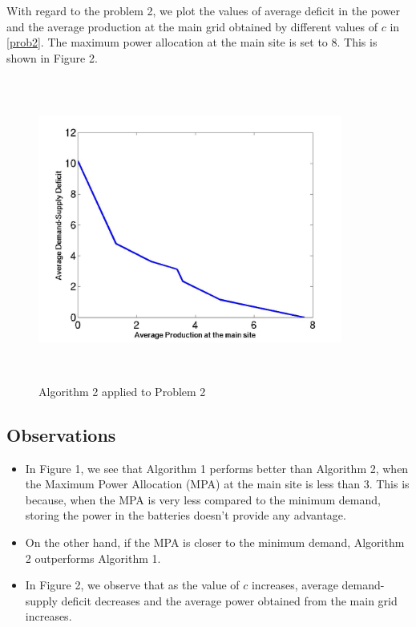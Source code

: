 \documentclass[conference]{IEEEtran}
\begin{document}
With regard to the problem 2, we plot the values of average deficit in the power and the average production at the main grid obtained by different values of $c$ in \eqref{prob2}. The maximum power allocation at the main site is set to 8. This is shown in Figure 2. 

\begin{figure}[h!]
\begin{center}
 \includegraphics[width = 10cm,height=10cm]{plot2.jpg}
 \caption{Algorithm 2 applied to Problem 2}
 \end{center}
 \end{figure}

\subsection{Observations}

\begin{itemize}
\item In Figure 1, we see that Algorithm 1 performs better than Algorithm 2, when the Maximum Power Allocation (MPA) at the main site is less than 3. This is because, when the MPA is very less compared to the minimum demand, storing the power in the batteries doesn't provide any advantage. 
\item On the other hand, if the MPA is closer to the minimum demand, Algorithm 2 outperforms Algorithm 1. 
\item In Figure 2, we observe that as the value of $c$ increases, average demand-supply deficit decreases and the average power obtained from the main grid increases. 
\end{itemize}
\end{document}

